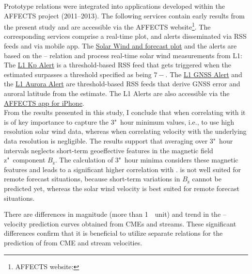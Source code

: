 Prototype \Kp{} relations were integrated into applications developed within the AFFECTS project (2011--2013). The following services contain early results from the present \Kp{} study and are accessible via the \mbox{AFFECTS} website\footnote{AFFECTS website: }. The corresponding services comprise a real-time plot, and alerts disseminated via RSS feeds and via mobile app. The \href{http://www.affects-fp7.eu/rssfeeds/ace_ap_forecast_plot/ace_realtime_ap_CH_GFT_plot.png}{Solar Wind and \Kp{} forecast plot} and the alerts are based on the \Kp--\vBz{} relation and process real-time solar wind measurements from L1: The \href{http://www.affects-fp7.eu/rssfeeds/rssfeed_kp/rssfeed_kp.xml}{L1 Kp Alert} is a threshold-based RSS feed that gets triggered when the estimated \Kp{} surpasses a threshold specified as being $7-$. The \href{http://www.affects-fp7.eu/rssfeeds/rssfeed_gnss/rssfeed_gnss.xml}{L1 GNSS Alert} and the \href{http://www.affects-fp7.eu/rssfeeds/rssfeed_aurora/rssfeed_aurora.xml}{L1 Aurora Alert} are threshold-based RSS feeds that derive GNSS error and auroral latitude from the \Kp{} estimate. The L1 Alerts are also accessible via the \href{https://itunes.apple.com/au/app/affects/id893579846}{AFFECTS app for iPhone}.\\


From the results presented in this study, I conclude that when correlating \vBz{} with \Kp{} it is of key importance to capture the 3"~hour minimum values, i.e., to use high resolution solar wind data, whereas when correlating velocity with \Kp{} the underlying data resolution is negligible. The results support that averaging over 3"~hour intervals neglects short-term geoeffective features in the magnetic field z"~component $B_\text{z}$. The calculation of 3"~hour minima considers these magnetic features and leads to a significant higher correlation with \Kp{}. \vBz{} is not well suited for remote forecast situations, because short-term variations in $B_\text{z}$ cannot be predicted yet, whereas the solar wind velocity is best suited for remote forecast situations.

There are differences in magnitude (more than 1~\Kp~unit) and trend in the \Kp--velocity prediction curves obtained from CMEs and streams. These significant differences confirm that it is beneficial to utilize separate relations for the prediction of \Kp{} from CME and stream velocities.


